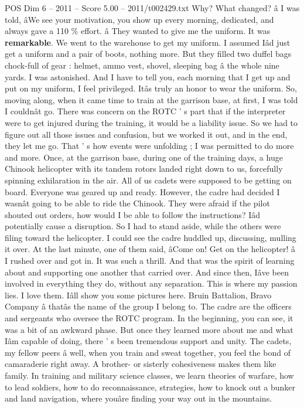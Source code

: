 \begin{textsample}{POS Dim 6 – 2011 – Score 5.00 – 2011/t002429.txt}
Why?
What changed? â I was told, âWe see your motivation, you show up every morning, dedicated, and always gave a 110 \% effort. â They wanted to give me the uniform.
It was \textbf{remarkable}.
We went to the warehouse to get my uniform.
I assumed Iâd just get a uniform and a pair of boots, nothing more.
But they filled two duffel bags chock-full of gear : helmet, ammo vest, shovel, sleeping bag â the whole nine yards.
I was astonished.
And I have to tell you, each morning that I get up and put on my uniform, I feel privileged.
Itâs truly an honor to wear the uniform.
So, moving along, when it came time to train at the garrison base, at first, I was told I couldnât go.
There was concern on the ROTC ' s part that if the interpreter were to get injured during the training, it would be a liability issue.
So we had to figure out all those issues and confusion, but we worked it out, and in the end, they let me go.
That ' s how events were unfolding ; I was permitted to do more and more.
Once, at the garrison base, during one of the training days, a huge Chinook helicopter with its tandem rotors landed right down to us, forcefully spinning exhilaration in the air.
All of us cadets were supposed to be getting on board.
Everyone was geared up and ready.
However, the cadre had decided I wasnât going to be able to ride the Chinook.
They were afraid if the pilot shouted out orders, how would I be able to follow the instructions?
Iâd potentially cause a disruption.
So I had to stand aside, while the others were filing toward the helicopter.
I could see the cadre huddled up, discussing, mulling it over.
At the last minute, one of them said, âCome on!
Get on the helicopter! â I rushed over and got in.
It was such a thrill.
And that was the spirit of learning about and supporting one another that carried over.
And since then, Iâve been involved in everything they do, without any separation.
This is where my passion lies.
I love them.
Iâll show you some pictures here.
Bruin Battalion, Bravo Company â thatâs the name of the group I belong to.
The cadre are the officers and sergeants who oversee the ROTC program.
In the beginning, you can see, it was a bit of an awkward phase.
But once they learned more about me and what Iâm capable of doing, there ' s been tremendous support and unity.
The cadets, my fellow peers â well, when you train and sweat together, you feel the bond of camaraderie right away.
A brother- or sisterly cohesiveness makes them like family.
In training and military science classes, we learn theories of warfare, how to lead soldiers, how to do reconnaissance, strategies, how to knock out a bunker and land navigation, where youâre finding your way out in the mountains.

\end{textsample}
